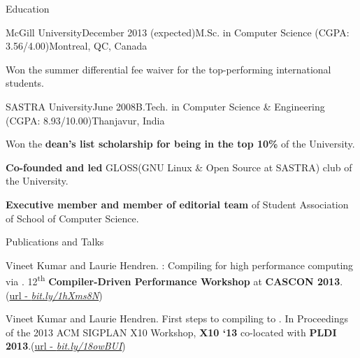 \documentclass{resume} %
\begin{document}
 \begin{rSection}{Education}

\begin{rSubsection}{McGill University}{December 2013 (expected)}{M.Sc. in Computer Science (CGPA: 3.56/4.00)}{Montreal, QC, Canada}
\item Won the summer differential fee waiver for the top-performing international students.
\end{rSubsection}
\begin{rSubsection}{SASTRA University}{June 2008}{B.Tech. in Computer Science \& Engineering (CGPA: 8.93/10.00)}{Thanjavur, India}
\item Won the  \textbf{dean's list scholarship for being in the top 10\% }of the University. 
\item \textbf{Co-founded and led} GLOSS(GNU Linux \& Open Source at SASTRA) club of the University.
\item \textbf{Executive member and member of editorial team} of Student Association of School of Computer Science. 
\end{rSubsection}

\end{rSection}


\begin{rSection}{Publications and Talks}
\smallskip
\begin{lSubsection}
\item Vineet Kumar and Laurie Hendren. \mixten: Compiling \matlab for high performance computing via \xten. 12\textsuperscript{th} \textbf{Compiler-Driven Performance Workshop} at \textbf{CASCON 2013}.(\href{http://webdocs.cs.ualberta.ca/~amaral/cascon/CDP13/#VinetKumar}{url - \em{bit.ly/1hXms8N}})
\item Vineet Kumar and Laurie Hendren. First steps to compiling \matlab to
\xten. In Proceedings of the 2013 ACM SIGPLAN X10 Workshop, \textbf{X10 `13}
co-located with \textbf{PLDI
2013}.(\href{http://www.sable.mcgill.ca/mclab/mix10/paper.pdf}{url - \em{bit.ly/18owBUI}})
\end{lSubsection}
\end{rSection}
\end{document}
